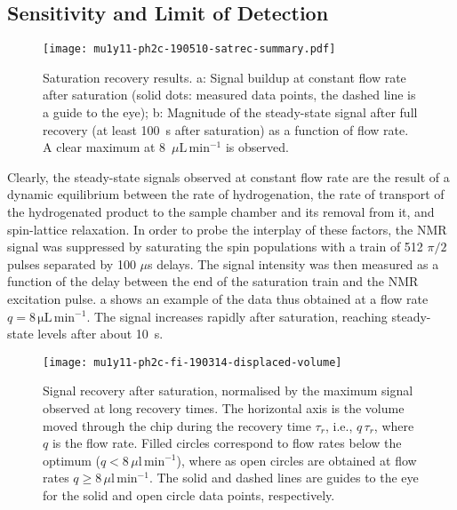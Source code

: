 \subsection{Sensitivity and Limit of Detection}

\begin{figure}
	\centering
	\texttt{[image: mu1y11-ph2c-190510-satrec-summary.pdf]}
	\caption{Saturation recovery results.
  a: Signal buildup at constant
	flow rate after saturation (solid dots: measured data points,
  the dashed line is a guide to the eye);
	b: Magnitude of the steady-state signal after full recovery (at least
	100~s after saturation) as a function of flow rate. A clear maximum
	at 8~$\mu\mathrm{L}\,\text{min}^{-1}$ is observed.}
	\label{fig:satrec-summary}
\end{figure}


Clearly, the steady-state signals observed at constant flow rate are the result
of a dynamic equilibrium between the rate of hydrogenation, the rate of
transport of the hydrogenated product to the sample chamber and its removal
from it, and spin-lattice relaxation. In order to probe the interplay of these
factors, the NMR signal was suppressed by saturating the spin populations
with a train of 512 $\pi/2$ pulses separated by 100 $\mu$s delays.
The signal intensity was then measured as a function of the delay between the
end of the saturation train and the NMR excitation pulse.
a shows an example of the data thus obtained at a
flow rate $q=8\,\mathrm{\mu L\,\text{min}^{-1}}$.
The signal increases rapidly after saturation, reaching
steady-state levels after about 10~s.

\begin{figure}
  \begin{center}
  \texttt{[image: mu1y11-ph2c-fi-190314-displaced-volume]}
  \end{center}
  \caption{Signal recovery after saturation, normalised by the maximum signal
  observed at long recovery times. The horizontal axis is the volume
  moved through the chip during the recovery time $\tau_r$, i.e., $q\,\tau_r$,
  where $q$ is the flow rate. Filled circles correspond to flow rates below
  the optimum ($q<8\,\mu\mathrm{l}\,\text{min}^{-1}$), where as open circles
  are obtained at flow rates $q\ge 8\,\mu\mathrm{l}\,\text{min}^{-1}$. The solid
  and dashed lines are guides to the eye for the solid and open circle data points,
  respectively.}
  \label{fig:displaced-volume}
\end{figure}

